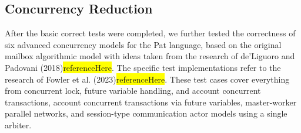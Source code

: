 \documentclass{l4proj}
\begin{document}
\begin{table}[ht]
\centering
\renewcommand{\arraystretch}{1.1}
\caption{Basic Correct Test Results}
\label{tab:Fundamental_results}
\end{table}




\subsection{Concurrency Reduction}
After the basic correct tests were completed, we further tested the correctness of six advanced concurrency models for the Pat language, based on the original mailbox algorithmic model with ideas taken from the research of de'Liguoro and Padovani (2018)\colorbox{yellow}{referenceHere}. The specific test implementations refer to the research of Fowler et al. (2023)\colorbox{yellow}{referenceHere}. These test cases cover everything from concurrent lock, future variable handling, and account concurrent transactions, account concurrent transactions via future variables, master-worker parallel networks, and session-type communication actor models using a single arbiter.
\end{document}
